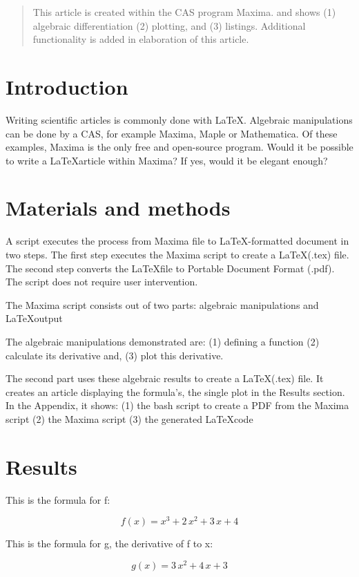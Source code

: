 \documentclass{article}
\begin{document}
\begin{abstract}
This article is created within the CAS program Maxima.
and shows (1) algebraic differentiation (2) plotting, and (3) listings.
Additional functionality is added in elaboration of this article.
\end{abstract}

\section{Introduction}

Writing scientific articles is commonly done with \LaTeX.
Algebraic manipulations can be done by a CAS, for example Maxima, Maple or Mathematica.
Of these examples, Maxima is the only free and open-source program.
Would it be possible to write a \LaTeX article within Maxima?
If yes, would it be elegant enough?

\section{Materials and methods}

A script executes the process from Maxima file to \LaTeX-formatted document in two steps.
The first step executes the Maxima script to create a \LaTeX (.tex) file.
The second step converts the \LaTeX file to Portable Document Format (.pdf).
The script does not require user intervention.

The Maxima script consists out of two parts:
algebraic manipulations and \LaTeX output

The algebraic manipulations demonstrated are: 
(1) defining a function
(2) calculate its derivative and,
(3) plot this derivative.

The second part uses these algebraic results to create a \LaTeX (.tex) file.
It creates an article displaying the formula's, the single plot in
the Results section.
In the Appendix, it shows: 
(1) the bash script to create a PDF from the Maxima script
(2) the Maxima script
(3) the generated \LaTeX code

\section{Results}

This is the formula for f:

$$f\left(x\right)=x^3+2\,x^2+3\,x+4$$

This is the formula for g, the derivative of f to x:

$$g\left(x\right)=3\,x^2+4\,x+3$$
\end{document}
